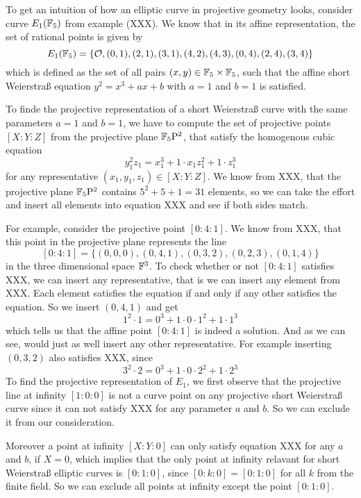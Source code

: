 \begin{example} To get an intuition of how an elliptic curve in projective geometry looks, consider curve $E_1(\mathbb{F}_5)$ from example (XXX). We know that in its affine representation, the set of rational points is given by 
$$
E_1(\mathbb{F}_5) = \{\mathcal{O}, (0,1),(2,1),(3,1),(4,2),(4,3),(0,4),(2,4),(3,4)\}
$$
which is defined as the set of all pairs $(x,y)\in \mathbb{F}_5\times \mathbb{F}_5$, such that the affine short Weierstraß equation $y^2 = x^3 + ax +b$ with $a=1$ and $b=1$ is satisfied.

To finde the projective representation of a short Weierstraß curve with the same parameters $a=1$ and $b=1$, we have to compute the set of projective points $[X:Y:Z]$ from the projective plane $\mathbb{F}_5\mathrm{P}^2$, that satisfy the homogenous cubic equation 
$$
y_1^2z_1 = x_1^3 + 1\cdot x_1 z_1^2 + 1\cdot z_1^3
$$
for any representative $(x_1,y_1,z_1)\in [X:Y:Z]$. We know from XXX, that the projective plane $\mathbb{F}_5\mathrm{P}^2$ contains $5^2+5+1= 31$ elements, so we can take the effort and insert all elements into equation XXX and see if both sides match.

For example, consider the projective point $[0:4:1]$. We know from XXX, that this point in the projective plane represents the line
$$
[0:4:1] = \{(0,0,0),(0,4,1),(0,3,2),(0,2,3),(0,1,4)\}
$$  
in the three dimensional space $\mathbb{F}^3$. To check whether or not $[0:4:1]$ satisfies XXX, we can insert any representative, that is we can insert any element from XXX. Each element satisfies the equation if and only if any other satisfies the equation. So we insert $(0,4,1)$ and get
$$
1^2\cdot 1 = 0^3 + 1\cdot 0\cdot 1^2 + 1\cdot 1^3
$$
which tells us that the affine point $[0:4:1]$ is indeed a solution. And as we can see, would just as well insert any other representative. For example inserting $(0,3,2)$ also satisfies XXX, since 
$$
3^2\cdot 2 = 0^3 + 1\cdot 0\cdot 2^2 + 1\cdot 2^3
$$
To find the projective representation of $E_1$, we first observe that the projective line at infinity $[1:0:0]$ is not a curve point on any projective short Weierstraß curve since it can not satisfy XXX for any parameter $a$ and $b$. So we can exclude it from our consideration. 

Moreover a point at infinity $[X:Y:0]$ can only satisfy equation XXX for any $a$ and $b$, if $X=0$, which implies that the only point at infinity relavant for short Weierstraß elliptic curves is $[0:1:0]$, since $[0:k:0]= [0:1:0]$ for all $k$ from the finite field. So we can exclude all points at infinity except the point $[0:1:0]$.


\end{example}

